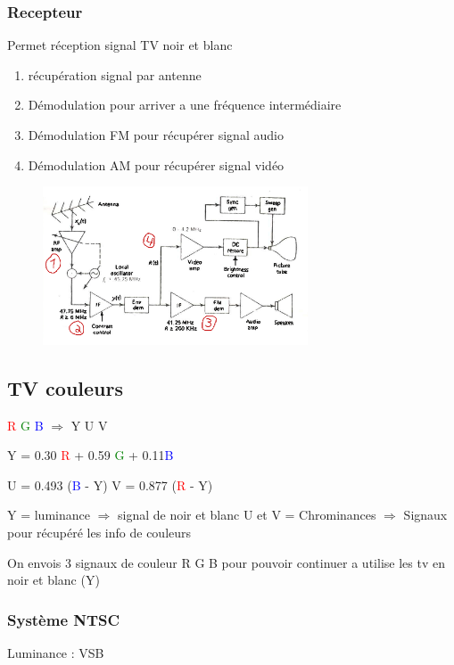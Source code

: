 \documentclass[12pt]{article}
\begin{document}
			\subsubsection{Recepteur}
				Permet réception signal TV noir et blanc
				\begin{enumerate}
					\item récupération signal par antenne
					\item Démodulation pour arriver a une fréquence intermédiaire
					\item Démodulation FM pour récupérer signal audio
					\item Démodulation AM pour récupérer signal vidéo
					
				\end{enumerate}
				
				\begin{figure}[htp]
				\centering
				\includegraphics[width=0.7\textwidth]{img/recepteurTVNoirBlanc.png}
				\end{figure}
		\newpage
		\subsection{TV couleurs}
			\textcolor{red}{R} \textcolor{green}{G} \textcolor{blue}{B} $\Rightarrow$ Y U V
			
			Y = 0.30 \textcolor{red}{R} + 0.59 \textcolor{green}{G} + 0.11\textcolor{blue}{B}
			
			U = 0.493 (\textcolor{blue}{B} - Y)
			V = 0.877 (\textcolor{red}{R} - Y)
			
			Y = luminance $\Rightarrow$ signal de noir et blanc
			U et V = Chrominances $\Rightarrow$ Signaux pour récupéré les info de couleurs
			
			On envois 3 signaux de couleur R G B pour pouvoir continuer a utilise les tv en noir et blanc (Y)
			
			\subsubsection{Système NTSC}
				Luminance : VSB
				
\end{document}

